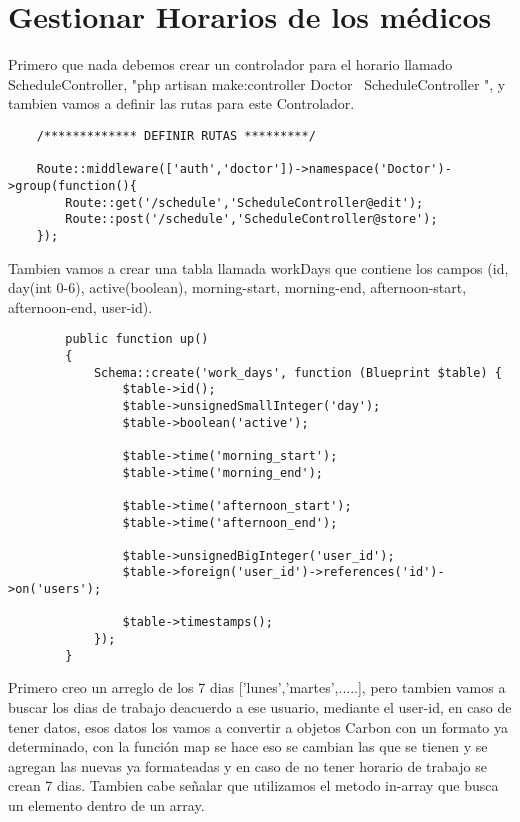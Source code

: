 \documentclass[a4paper]{article}
\begin{document}
	\section{Gestionar Horarios de los médicos}
	
	Primero que nada debemos crear un controlador para el horario llamado ScheduleController, "php artisan make:controller Doctor \ ScheduleController ", y tambien vamos a definir las rutas para este Controlador.
	
	\begin{lstlisting}
	/************* DEFINIR RUTAS *********/
	
	Route::middleware(['auth','doctor'])->namespace('Doctor')->group(function(){
		Route::get('/schedule','ScheduleController@edit');
		Route::post('/schedule','ScheduleController@store');
	});

	\end{lstlisting}


	Tambien vamos a crear una tabla llamada workDays que contiene los campos (id, day(int 0-6), active(boolean), morning-start, morning-end, afternoon-start, afternoon-end, user-id).
	
	\begin{lstlisting}
		public function up()
		{
			Schema::create('work_days', function (Blueprint $table) {
				$table->id();
				$table->unsignedSmallInteger('day');
				$table->boolean('active');
				
				$table->time('morning_start');
				$table->time('morning_end');
				
				$table->time('afternoon_start');
				$table->time('afternoon_end');
				
				$table->unsignedBigInteger('user_id');
				$table->foreign('user_id')->references('id')->on('users');
				
				$table->timestamps();
			});
		}
	\end{lstlisting}

	Primero creo un arreglo de los 7 dias ['lunes','martes',.....], pero tambien vamos a buscar los dias de trabajo deacuerdo a ese usuario, mediante el user-id, en caso de tener datos, esos datos los vamos a convertir a objetos Carbon con un formato ya determinado, con la función map se hace eso se cambian las que se tienen y se agregan las nuevas ya formateadas y en caso de no tener horario de trabajo se crean 7 dias. Tambien cabe señalar que utilizamos el metodo in-array que busca un elemento dentro de un array. 
	
\end{document}

